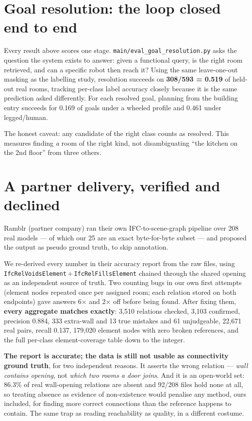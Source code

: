 \documentclass[11pt,a4paper]{article}
\begin{document}
\section{Goal resolution: the loop closed end to end}

Every result above scores one stage. \texttt{main/eval\_goal\_resolution.py}
asks the question the system exists to answer: given a functional query, is the
right room retrieved, and can a specific robot then reach it? Using the same
leave-one-out masking as the labelling study, resolution succeeds on
\textbf{308/593 = 0.519} of held-out real rooms, tracking per-class label
accuracy closely because it is the same prediction asked differently. For each
resolved goal, planning from the building entry succeeds for 0.169 of goals
under a wheeled profile and 0.461 under legged/human.

The honest caveat: any candidate of the right class counts as resolved. This
measures finding \emph{a} room of the right kind, not disambiguating ``the
kitchen on the 2nd floor'' from three others.

\section{A partner delivery, verified and declined}

Ramblr (partner company) ran their own IFC-to-scene-graph pipeline over 208 real
models --- of which our 25 are an exact byte-for-byte subset --- and proposed the
output as pseudo ground truth, to skip annotation.

We re-derived every number in their accuracy report from the raw files, using
\texttt{IfcRelVoidsElement}\,+\,\texttt{IfcRelFillsElement} chained through the
shared opening as an independent source of truth. Two counting bugs in our own
first attempts (element nodes repeated once per assigned room; each relation
stored on both endpoints) gave answers 6$\times$ and 2$\times$ off before being
found. After fixing them, \textbf{every aggregate matches exactly}: 3{,}510
relations checked, 3{,}103 confirmed, precision 0.884, 333 extra-wall and 13
true mistakes and 61 unjudgeable, 22{,}671 real pairs, recall 0.137, 179{,}020
element nodes with zero broken references, and the full per-class
element-coverage table down to the integer.

\textbf{The report is accurate; the data is still not usable as connectivity
ground truth}, for two independent reasons. It asserts the wrong relation ---
\emph{wall contains opening}, not \emph{which two rooms a door joins}. And it is
an open-world set: 86.3\% of real wall-opening relations are absent and 92/208
files hold none at all, so treating absence as evidence of non-existence would
penalise any method, ours included, for finding more correct connections than
the reference happens to contain. The same trap as reading reachability as
quality, in a different costume.
\end{document}
